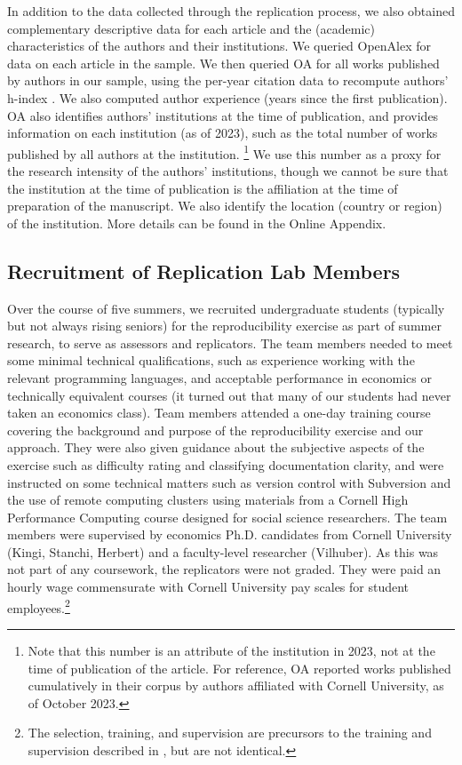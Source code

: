 In addition to the data collected through the replication process, we also obtained complementary descriptive data for each article and the (academic) characteristics of the authors and their institutions. We queried OpenAlex \parencite[OA,][]{openalex2022,ourresearch2023} for  data on each article in the sample. We then queried OA for all works published by authors in our sample, using the per-year citation data to recompute authors' h-index \parencite{Hirsch2005}. We also computed author experience (years since the first publication). OA also identifies authors' institutions at the time of publication, and provides information on each institution (as of 2023), such as the total number of works published by all authors at the  institution.%
%
\footnote{Note that this number is an attribute of the institution in 2023, not at the time of publication of the article. For reference, OA reported  works published cumulatively in their corpus by authors affiliated with Cornell University, as of October 2023.}
%
We use this number as a proxy for the research intensity of the authors' institutions, though we cannot be sure that the institution at the time of publication is the affiliation at the time of preparation of the manuscript. We also identify the location (country or region) of the institution.  More details can be found in the Online Appendix.

\subsection{Recruitment of Replication Lab Members}

Over the course of five summers, we recruited undergraduate students (typically but not always rising seniors) for the reproducibility exercise as part of summer research, to serve as assessors and replicators. The team members needed to meet some minimal technical qualifications, such as experience working with the relevant programming languages, and acceptable performance in economics or technically equivalent courses (it turned out that many of our students had never taken an economics class). Team members attended a one-day training course covering the background and purpose of the reproducibility exercise and our approach. They were also given guidance about the subjective aspects of the exercise such as difficulty rating and classifying documentation clarity, and were instructed on some technical matters such as version control with Subversion and the use of remote computing clusters using materials from a Cornell High Performance Computing course designed for social science researchers. The team members were supervised by economics Ph.D. candidates from Cornell University (Kingi, Stanchi, Herbert) and a faculty-level researcher (Vilhuber). As this was not part of any coursework, the replicators were not graded. They were paid an hourly wage commensurate with Cornell University pay scales for student employees.\footnote{The selection, training, and supervision are precursors to the training and supervision described in \textcite{vilhuber2022b}, but are not identical.}

\FloatBarrier
